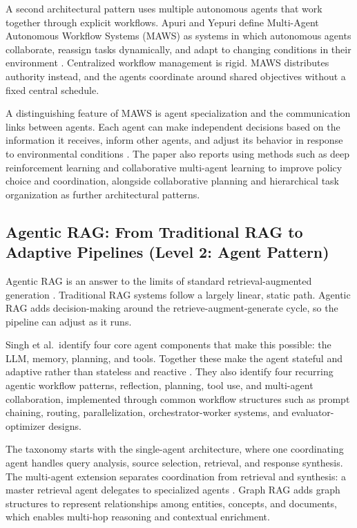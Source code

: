 \documentclass[sn-basic,Numbered]{sn-jnl}
\begin{document}
A second architectural pattern uses multiple autonomous agents that work
together through explicit workflows. Apuri and Yepuri define Multi-Agent
Autonomous Workflow Systems (MAWS) as systems in which autonomous agents
collaborate, reassign tasks dynamically, and adapt to changing conditions
in their environment \cite{apuri2026maws}. Centralized workflow
management is rigid. MAWS distributes authority instead, and the agents
coordinate around shared objectives without a fixed central schedule.

A distinguishing feature of MAWS is agent specialization and the
communication links between agents. Each agent can make independent
decisions based on the information it receives, inform other agents,
and adjust its behavior in response to environmental conditions
\cite{apuri2026maws}. The paper also reports using methods such as
deep reinforcement learning and collaborative multi-agent learning to
improve policy choice and coordination, alongside collaborative
planning and hierarchical task organization as further architectural
patterns.

\subsection{Agentic RAG: From Traditional RAG to Adaptive Pipelines (Level 2: Agent Pattern)}
\label{sec:agenticrag}

Agentic RAG is an answer to the limits of
standard retrieval-augmented generation \cite{singh2025agentrag}.
Traditional RAG systems follow a largely linear, static path. Agentic
RAG adds decision-making around the retrieve-augment-generate cycle,
so the pipeline can adjust as it runs.

Singh et al.\ identify four core agent components that make this
possible: the LLM, memory, planning, and tools. Together these make
the agent stateful and adaptive rather than stateless and reactive
\cite{singh2025agentrag}. They also identify four recurring agentic
workflow patterns, reflection, planning, tool use, and multi-agent
collaboration, implemented through common workflow structures such as
prompt chaining, routing, parallelization, orchestrator-worker
systems, and evaluator-optimizer designs.

The taxonomy starts with the single-agent architecture, where one
coordinating agent handles query analysis, source selection,
retrieval, and response synthesis. The multi-agent extension separates
coordination from retrieval and synthesis: a master retrieval agent
delegates to specialized agents \cite{singh2025agentrag}. Graph RAG
adds graph structures to represent relationships among entities,
concepts, and documents, which enables multi-hop reasoning and
contextual enrichment.
\end{document}
